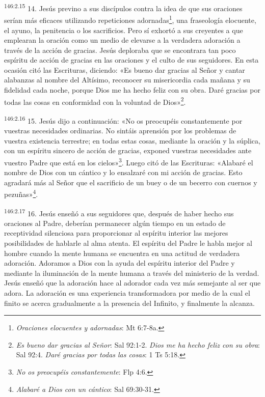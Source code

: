 \par
\textsuperscript{146:2.15} 14. Jesús previno a sus discípulos contra la idea de que sus oraciones serían más eficaces utilizando repeticiones adornadas\footnote{\textit{Oraciones elocuentes y adornadas}: Mt 6:7-8a.}, una fraseología elocuente, el ayuno, la penitencia o los sacrificios. Pero sí exhortó a sus creyentes a que emplearan la oración como un medio de elevarse a la verdadera adoración a través de la acción de gracias. Jesús deploraba que se encontrara tan poco espíritu de acción de gracias en las oraciones y el culto de sus seguidores. En esta ocasión citó las Escrituras, diciendo: «Es bueno dar gracias al Señor y cantar alabanzas al nombre del Altísimo, reconocer su misericordia cada mañana y su fidelidad cada noche, porque Dios me ha hecho feliz con su obra. Daré gracias por todas las cosas en conformidad con la voluntad de Dios»\footnote{\textit{Es bueno dar gracias al Señor}: Sal 92:1-2. \textit{Dios me ha hecho feliz con su obra}: Sal 92:4. \textit{Daré gracias por todas las cosas}: 1 Ts 5:18.}.

\par
\textsuperscript{146:2.16} 15. Jesús dijo a continuación: «No os preocupéis constantemente por vuestras necesidades ordinarias. No sintáis aprensión por los problemas de vuestra existencia terrestre; en todas estas cosas, mediante la oración y la súplica, con un espíritu sincero de acción de gracias, exponed vuestras necesidades ante vuestro Padre que está en los cielos»\footnote{\textit{No os preocupéis constantemente}: Flp 4:6.}. Luego citó de las Escrituras: «Alabaré el nombre de Dios con un cántico y lo ensalzaré con mi acción de gracias. Esto agradará más al Señor que el sacrificio de un buey o de un becerro con cuernos y pezuñas»\footnote{\textit{Alabaré a Dios con un cántico}: Sal 69:30-31.}.

\par
\textsuperscript{146:2.17} 16. Jesús enseñó a sus seguidores que, después de haber hecho sus oraciones al Padre, deberían permanecer algún tiempo en un estado de receptividad silenciosa para proporcionar al espíritu interior las mejores posibilidades de hablarle al alma atenta. El espíritu del Padre le habla mejor al hombre cuando la mente humana se encuentra en una actitud de verdadera adoración. Adoramos a Dios con la ayuda del espíritu interior del Padre y mediante la iluminación de la mente humana a través del ministerio de la verdad. Jesús enseñó que la adoración hace al adorador cada vez más semejante al ser que adora. La adoración es una experiencia transformadora por medio de la cual el finito se acerca gradualmente a la presencia del Infinito, y finalmente la alcanza.

